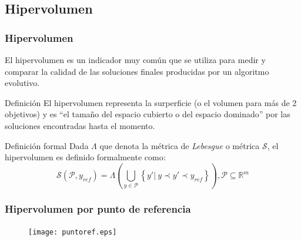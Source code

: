 \documentclass[10pt,compress]{beamer}
\begin{document}
\subsection{Hipervolumen}
\begin{frame}
	\frametitle{Hipervolumen}
	 El hipervolumen es un indicador muy com\'un que se utiliza para medir y comparar la calidad de las soluciones
  finales producidas por un algoritmo evolutivo.
	
	\begin{block}{Definici\'on}
		El hipervolumen representa la surperficie (o el volumen para m\'as de 2 objetivos) y es ``el tama\~no del espacio cubierto o del espacio dominado''
		por las soluciones encontradas hasta el momento.
	\end{block}  

	\begin{block}{Definici\'on formal}
		Dada $\Lambda$ que denota la m\'etrica de \textit{Lebesgue} 
   o m\'etrica $\mathcal{S}$, el hipervolumen es definido formalmente como:
		\[
		\mathcal{S}(\mathcal{P},y_{ref}) = \Lambda \left(\bigcup_{y \in \mathcal{P}} \left\{ y' |~ y \prec y' \prec y_{ref} \right\} \right), 
		\mathcal{P} \subseteq \mathbb{R}^m
		\]
	\end{block}
\end{frame} 
\begin{frame}
	\frametitle{Hipervolumen por punto de referencia}
	\begin{figure}
	\centering
	\texttt{[image: puntoref.eps]}
      
      \end{figure}
\end{frame}
\end{document}
